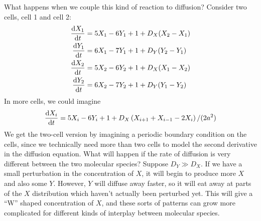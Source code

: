 \documentclass[a4paper,twoside,master.tex]{subfiles}
\begin{document}
What happens when we couple this kind of reaction to diffusion? Consider two cells, cell 1 and cell 2:
\begin{align}
    \dv{X_1}{t} &= 5X_1 - 6 Y_1 + 1 + D_X(X_2 - X_1) \\
    \dv{Y_1}{t} &= 6 X_1 - 7 Y_1 + 1 + D_Y(Y_2 - Y_1) \\
    \dv{X_2}{t} &= 5X_2 - 6 Y_2 + 1 + D_X(X_1 - X_2) \\
    \dv{Y_2}{t} &= 6 X_2 - 7 Y_2 + 1 + D_Y(Y_1 - Y_2) \\
\end{align}
In more cells, we could imagine
\begin{equation}
    \dv{X_i}{t} = 5 X_i - 6 Y_i + 1 + D_X\left( X_{i+1} + X_{i-1} - 2X_i \right)/(2 a^2)
\end{equation}
We get the two-cell version by imagining a periodic boundary condition on the cells, since we technically need more than two cells to model the second derivative in the diffusion equation. What will happen if the rate of diffusion is very different between the two molecular species? Suppose $ D_Y \gg D_X $. If we have a small perturbation in the concentration of $ X $, it will begin to produce more $ X $ and also some $ Y $. However, $ Y $ will diffuse away faster, so it will eat away at parts of the $ X $ distribution which haven't actually been perturbed yet. This will give a ``W'' shaped concentration of $ X $, and these sorts of patterns can grow more complicated for different kinds of interplay between molecular species.
\end{document}
